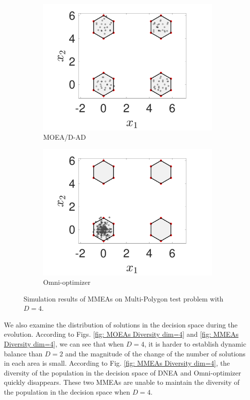\documentclass[conference]{IEEEtran}
\begin{document}
\begin{figure}[htbp]
    \begin{subfigure}[b]{.24\textwidth}
    \includegraphics[width=\linewidth]{Section5/dim4/PS/MOEADAD}
    \caption{MOEA/D-AD}
    \end{subfigure}
    \begin{subfigure}[b]{.24\textwidth}
    \includegraphics[width=\linewidth]{Section5/dim4/PS/OmniOptimizer}
    \caption{Omni-optimizer}
    \end{subfigure}
    \caption{Simulation results of MMEAs on Multi-Polygon test problem with $D=4$.}
    \label{fig: MMEAs PS dim=4}
\end{figure}

We also examine the distribution of solutions in the decision space during the evolution. According to Figs. \ref{fig: MOEAs Diversity dim=4} and \ref{fig: MMEAs Diversity dim=4}, we can see that when $D=4$, it is harder to establish dynamic balance than $D=2$ and the magnitude of the change of the number of solutions in each area is small. According to Fig. \ref{fig: MMEAs Diversity dim=4}, the diversity of the population in the decision space of DNEA and Omni-optimizer quickly disappears. These two MMEAs are unable to maintain the diversity of the population in the decision space when $D=4$. 
\end{document}
